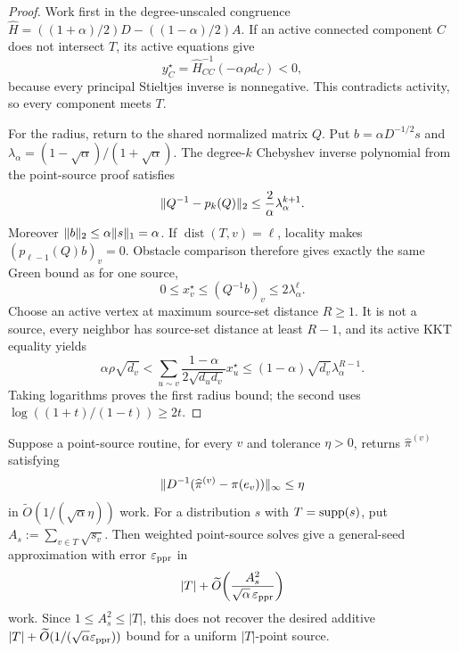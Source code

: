 \begin{proof}
Work first in the degree-unscaled congruence
$\widehat H=((1+\alpha)/2)D-((1-\alpha)/2)A$.
If an active connected component $C$ does not intersect $T$, its active
equations give
\begin{equation*}
 y_C^\star=\widehat H_{CC}^{-1}(-\alpha\rho d_C)<0,
\end{equation*}
because every principal Stieltjes inverse is nonnegative.  This contradicts
activity, so every component meets $T$.

For the radius, return to the shared normalized matrix $Q$.  Put
$b=\alpha D^{-1/2}s$ and
$\lambda_\alpha=(1-\sqrt\alpha)/(1+\sqrt\alpha)$.  The degree-$k$
Chebyshev inverse polynomial from the point-source proof satisfies
\begin{equation*}
 \lVert Q^{-1}-p_k(Q)\rVert_2\leq\frac2\alpha\lambda_\alpha^{k+1}.
\end{equation*}
Moreover $\lVert b\rVert_2\leq\alpha\lVert s\rVert_1=\alpha$.  If
$\operatorname{dist}(T,v)=\ell$, locality makes
$(p_{\ell-1}(Q)b)_v=0$.  Obstacle comparison therefore gives exactly the
same Green bound as for one source,
\begin{equation*}
 0\leq x_v^\star\leq(Q^{-1}b)_v\leq2\lambda_\alpha^\ell.
\end{equation*}
Choose an active vertex at maximum source-set distance $R\geq1$.  It is
not a source, every neighbor has source-set distance at least $R-1$, and
its active KKT equality yields
\begin{equation*}
 \alpha\rho\sqrt{d_v}
 <\sum_{u\sim v}\frac{1-\alpha}{2\sqrt{d_ud_v}}x_u^\star
 \leq(1-\alpha)\sqrt{d_v}\lambda_\alpha^{R-1}.
\end{equation*}
Taking logarithms proves the first radius bound; the second uses
$\log((1+t)/(1-t))\geq2t$.
\end{proof}

\begin{proposition}
\label{prop:aesp-cd-point-source-linear-reduction}
Suppose a point-source routine, for every $v$ and tolerance $\eta>0$, returns
$\widehat\pi^{(v)}$ satisfying
\begin{equation*}
 \lVert D^{-1}(\widehat\pi^{(v)}-\pi(e_v))\rVert_\infty\leq\eta
\end{equation*}
in $\widetilde O(1/(\sqrt\alpha\eta))$ work.  For a distribution $s$ with
$T=\operatorname{supp}(s)$, put $A_s:=\sum_{v\in T}\sqrt{s_v}$.  Then weighted point-source
solves give a general-seed approximation with error $\varepsilon_{\mathrm{ppr}}$ in
\begin{equation}
 |T|+\widetilde O\!\left(
  \frac{A_s^2}{\sqrt\alpha\,\varepsilon_{\mathrm{ppr}}}
 \right)
 \label{eq:aesp-cd-point-source-linear-reduction}
\end{equation}
work.  Since $1\leq A_s^2\leq|T|$, this does not recover the desired additive
$|T|+\widetilde O(1/(\sqrt\alpha\varepsilon_{\mathrm{ppr}}))$ bound for a uniform $|T|$-point
source.
\end{proposition}

